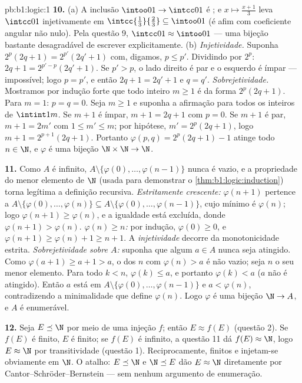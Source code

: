 \begin{solution}{pb:b1:logic:1}
\textbf{10.} (a) A inclusão $\intoo01 \to \intcc01$ é ;
e $x \mapsto \frac{x + 1}3$ leva $\intcc01$ injetivamente em
$\intcc{\frac13}{\frac23} \subseteq \intoo01$ (é afim com
coeficiente angular não nulo). Pela questão 9, $\intcc01 \approx \intoo01$ --- uma
bijeção bastante desagradável de escrever explicitamente.
(b) \emph{Injetividade.} Suponha $2^p(2q + 1) = 2^{p'}(2q' + 1)$ com,
digamos, $p \leq p'$. Dividindo por $2^p$: $2q + 1 = 2^{p' - p}(2q' + 1)$.
Se $p' > p$, o lado direito é par e o esquerdo é ímpar ---
impossível; logo $p = p'$, e então $2q + 1 = 2q' + 1$ e $q = q'$.
\emph{Sobrejetividade.} Mostramos por indução forte que todo inteiro
$m \geq 1$ é da forma $2^p(2q + 1)$. Para $m = 1$: $p = q = 0$.
Seja $m \geq 1$ e suponha a afirmação para todos os inteiros de
$\intint1m$. Se $m + 1$ é ímpar, $m + 1 = 2q + 1$ com $p = 0$. Se
$m + 1$ é par, $m + 1 = 2m'$ com $1 \leq m' \leq m$; por
hipótese, $m' = 2^p(2q + 1)$, logo $m + 1 = 2^{p+1}(2q + 1)$. Portanto
$\varphi(p, q) = 2^p(2q + 1) - 1$ atinge todo $n \in \N$, e
$\varphi$ é uma bijeção $\N \times \N \to \N$.

\textbf{11.} Como $A$ é infinito, $A \setminus \{\varphi(0), \dots,
\varphi(n - 1)\}$ nunca é vazio, e a propriedade do menor elemento de
$\N$ (usada para demonstrar o \cref{thm:b1:logic:induction}) torna legítima a
definição recursiva. \emph{Estritamente crescente:}
$\varphi(n + 1)$ pertence a $A \setminus \{\varphi(0), \dots,
\varphi(n)\} \subseteq A \setminus \{\varphi(0), \dots, \varphi(n -
1)\}$, cujo mínimo é $\varphi(n)$; logo $\varphi(n + 1) \geq
\varphi(n)$, e a igualdade está excluída, donde $\varphi(n+1) >
\varphi(n)$. \emph{$\varphi(n) \geq n$:} por indução, $\varphi(0)
\geq 0$, e $\varphi(n + 1) \geq \varphi(n) + 1 \geq n + 1$.
A \emph{injetividade} decorre da monotonicidade estrita.
\emph{Sobrejetividade sobre $A$:} suponha que algum $a \in A$ nunca seja
atingido. Como $\varphi(a + 1) \geq a + 1 > a$, o  dos $n$ com
$\varphi(n) > a$ é não vazio; seja $n$ o seu menor elemento. Para todo
$k < n$, $\varphi(k) \leq a$, e portanto $\varphi(k) < a$ ($a$ não é
atingido). Então $a$ está em $A \setminus \{\varphi(0), \dots,
\varphi(n - 1)\}$ e $a < \varphi(n)$, contradizendo a minimalidade
que define $\varphi(n)$. Logo $\varphi$ é uma bijeção $\N \to A$, e
$A$ é enumerável.

\textbf{12.} Seja $E \preceq \N$ por meio de uma injeção $f$; então $E \approx
f(E)$ (questão 2). Se $f(E)$ é finito, $E$ é finito; se $f(E)$ é
infinito, a questão 11 dá $f(E) \approx \N$, logo $E \approx \N$ por
transitividade (questão 1). Reciprocamente,  finitos e  injetam-se obviamente em $\N$. O atalho: $E \preceq \N$ e $\N
\preceq E$ dão $E \approx \N$ diretamente por
Cantor--Schröder--Bernstein --- sem nenhum argumento de enumeração.


\end{solution}
